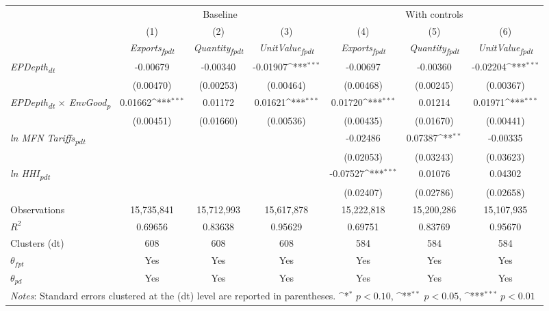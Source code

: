 {
\def\sym#1{\ifmmode^{#1}\else\(^{#1}\)\fi}
\begin{tabular}{l*{6}{c}}
\toprule
&\multicolumn{3}{c}{Baseline}&\multicolumn{3}{c}{With controls}\\\cmidrule(lr){2-4}\cmidrule(lr){5-7}
&(1)&(2)&(3)&(4)&(5)&(6)\\
&\textit{Exports\textsubscript{fpdt}}&\textit{Quantity\textsubscript{fpdt}}&\textit{UnitValue\textsubscript{fpdt}}&\textit{Exports\textsubscript{fpdt}}&\textit{Quantity\textsubscript{fpdt}}&\textit{UnitValue\textsubscript{fpdt}}\\
\midrule
\textit{EPDepth\textsubscript{dt}} & -0.00679 & -0.00340 & -0.01907\sym{***} & -0.00697 & -0.00360 & -0.02204\sym{***}\\
 & (0.00470) & (0.00253) & (0.00464) & (0.00468) & (0.00245) & (0.00367)\\
\addlinespace
\textit{EPDepth\textsubscript{dt} $\times$ EnvGood\textsubscript{p}} & 0.01662\sym{***} & 0.01172 & 0.01621\sym{***} & 0.01720\sym{***} & 0.01214 & 0.01971\sym{***}\\
 & (0.00451) & (0.01660) & (0.00536) & (0.00435) & (0.01670) & (0.00441)\\
\addlinespace
\textit{ln MFN Tariffs\textsubscript{pdt}} &  &  &  & -0.02486 & 0.07387\sym{**} & -0.00335\\
 &  &  &  & (0.02053) & (0.03243) & (0.03623)\\
\addlinespace
\textit{ln HHI\textsubscript{pdt}} &  &  &  & -0.07527\sym{***} & 0.01076 & 0.04302\\
 &  &  &  & (0.02407) & (0.02786) & (0.02658)\\
\midrule
Observations & 15,735,841 & 15,712,993 & 15,617,878 & 15,222,818 & 15,200,286 & 15,107,935\\
$R^{2}$ & 0.69656 & 0.83638 & 0.95629 & 0.69751 & 0.83769 & 0.95670\\
Clusters (dt) & 608 & 608 & 608 & 584 & 584 & 584\\
$\theta_{fpt}$ & Yes & Yes & Yes & Yes & Yes & Yes\\
$\theta_{pd}$ & Yes & Yes & Yes & Yes & Yes & Yes\\
\bottomrule
\multicolumn{7}{l}{\footnotesize \textit{Notes}: Standard errors clustered at the (dt) level are reported in parentheses. \sym{*} \(p<0.10\), \sym{**} \(p<0.05\), \sym{***} \(p<0.01\)}\\
\end{tabular}
}
